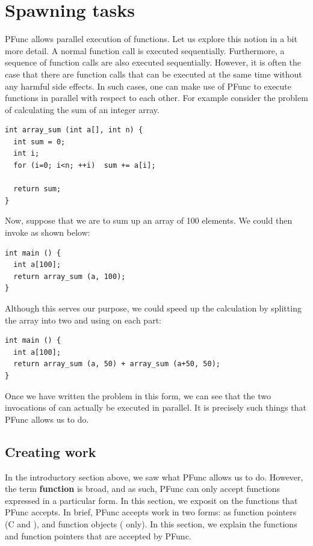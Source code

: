 \section{Spawning tasks}
\label{sec:spawn}

PFunc allows parallel execution of functions.  Let us explore this notion in a
bit more detail.  A normal function call is executed sequentially.
Furthermore, a sequence of function calls are also executed sequentially.
However, it is often the case that there are function calls that can be
executed at the same time without any harmful side effects.  In such cases, one
can make use of PFunc to execute functions in parallel with respect to each
other.  For example consider the problem of calculating the sum of an integer
array.

\begin{lstlisting}
int array_sum (int a[], int n) {
  int sum = 0;
  int i;
  for (i=0; i<n; ++i)  sum += a[i];

  return sum;
} 
\end{lstlisting}

Now, suppose that we are to sum up an array of 100 elements. We could then 
invoke  as shown below:

\begin{lstlisting}
int main () {
  int a[100];
  return array_sum (a, 100);
}
\end{lstlisting}

Although this serves our purpose, we could speed up the calculation by 
splitting the array into two and using  on each part:

\begin{lstlisting}
int main () {
  int a[100];
  return array_sum (a, 50) + array_sum (a+50, 50);
}
\end{lstlisting}

Once we have written the problem in this form, we can see that the two 
invocations of  can actually be executed in parallel. It is
precisely such things that PFunc allows us to do.

\subsection{Creating work}
In the introductory section above, we saw what PFunc allows us to do.
However, the term \textbf{function} is broad, and as such, PFunc can only accept
functions expressed in a particular form. In this section, we exposit on the
functions that PFunc accepts. In brief, PFunc accepts work in two forms: as
function pointers (C and \Cpp{}), and function objects (\Cpp{} only).  In this
section, we explain the functions and function pointers that are accepted by
PFunc.

